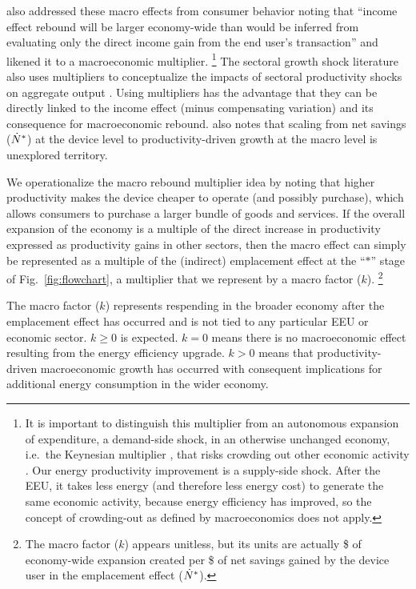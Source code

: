 \documentclass[12pt]{article}\usepackage[]{graphicx}\usepackage[]{xcolor}
\begin{document}
\citeauthor{Borenstein:2015aa} also addressed these macro effects 
from consumer behavior
noting that ``income effect rebound will be larger economy-wide than 
would be inferred from evaluating only the direct income gain from 
the end user's transaction'' \citep[p.~11]{Borenstein:2015aa} and 
likened it to a macroeconomic multiplier.%
\footnote{
  It is important
  to distinguish this multiplier from an
  autonomous expansion of expenditure, a demand-side shock,
  in an otherwise unchanged economy,
  i.e.\ the Keynesian multiplier \citep{Kahn1931,Keynes1936}, 
  that risks crowding out other economic activity \citep{Gillingham2016}. 
  Our energy productivity improvement is a supply-side shock. 
  After the EEU, 
  it takes less energy (and therefore less energy cost)
  to generate the same economic activity, because 
  energy efficiency has improved, so the concept of crowding-out as defined by
  macroeconomics does not apply.
}
%
The sectoral growth shock literature also uses multipliers to conceptualize
the impacts of sectoral productivity shocks on aggregate output 
\citep{Foerster2022, Buera2024}.
Using multipliers has the advantage that they can be directly
linked to the income effect
(minus compensating variation) 
and its consequence for macroeconomic rebound. 
\citeauthor{Borenstein:2015aa} also notes that scaling from net 
savings (${\dot{N}}^*$) at the device level
to productivity-driven growth at the macro level is unexplored territory.

We operationalize the macro rebound multiplier idea
by noting that 
higher productivity 
makes the device cheaper to operate (and possibly purchase), 
which allows consumers to
purchase a larger bundle of goods and services.
If the overall expansion of the economy is a multiple
of the direct increase in productivity expressed as productivity
gains in other sectors, 
then the macro effect can simply
be represented as a multiple of the (indirect) emplacement effect
at the ``$*$'' stage of Fig.~\ref{fig:flowchart},
a multiplier that we represent by a macro factor ($k$).%
\footnote{
  The macro factor ($k$) appears unitless,
  but its units are actually \$ of economy-wide expansion created 
  per \$ of net savings gained
  by the device user in the emplacement effect (${\dot{N}}^*$).
}

The macro factor ($k$) represents respending in the broader economy 
after the emplacement effect has occurred
and is not tied to any particular EEU or economic sector.
$k \ge 0$ is expected.
$k = 0$ means there is no macroeconomic effect
resulting from the energy efficiency upgrade.
$k > 0$ means that productivity-driven macroeconomic growth has occurred
with consequent implications for additional energy consumption in the wider economy.
\end{document}
